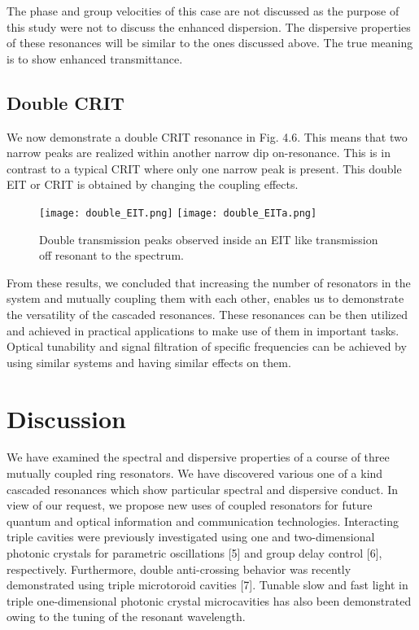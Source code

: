 The phase and group velocities of this case are not discussed as the purpose of this study were not to discuss the enhanced dispersion. The dispersive properties of these resonances will be similar to the ones discussed above. The true meaning is to show enhanced transmittance.


\subsection{Double CRIT}
We now demonstrate a double CRIT resonance in Fig. 4.6. This means that two narrow peaks are realized within another narrow dip on-resonance. This is in contrast to a typical CRIT where only one narrow peak is present. This double EIT or CRIT is obtained by changing the coupling effects. 

\begin{figure}[t]
\centering
\texttt{[image: double\_EIT.png]}
\texttt{[image: double\_EITa.png]}
\caption{Double transmission peaks observed inside an EIT like transmission off resonant to the spectrum.}
\end{figure}


From these results, we concluded that increasing the number of resonators in the system and mutually coupling them with each other, enables us to demonstrate the versatility of the cascaded resonances. These resonances can be then utilized and achieved in practical applications to make use of them in important tasks. Optical tunability and signal filtration of specific frequencies can be achieved by using similar systems and having similar effects on them.

\newpage
\section{Discussion}
We have examined the spectral and dispersive properties of a course of three mutually coupled ring resonators. We have discovered various one of a kind cascaded resonances which show particular spectral and dispersive conduct. In view of our request, we propose new uses of coupled resonators for future quantum and optical information and communication technologies. Interacting triple cavities were previously investigated using one and two-dimensional photonic crystals for parametric oscillations [5] and group delay control [6], respectively. Furthermore, double anti-crossing behavior was recently demonstrated using triple microtoroid cavities [7]. Tunable slow and fast light in triple one-dimensional photonic crystal microcavities has also been demonstrated owing to the tuning of the resonant wavelength.

